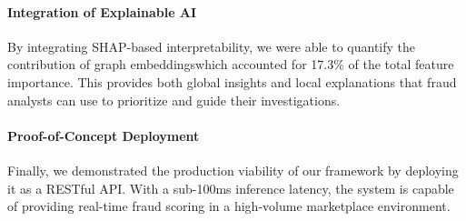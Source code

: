 \paragraph{Integration of Explainable AI}
By integrating SHAP-based interpretability, we were able to quantify the contribution of graph embeddingswhich accounted for 17.3\% of the total feature importance. This provides both global insights and local explanations that fraud analysts can use to prioritize and guide their investigations.

\paragraph{Proof-of-Concept Deployment}
Finally, we demonstrated the production viability of our framework by deploying it as a RESTful API. With a sub-100ms inference latency, the system is capable of providing real-time fraud scoring in a high-volume marketplace environment.
